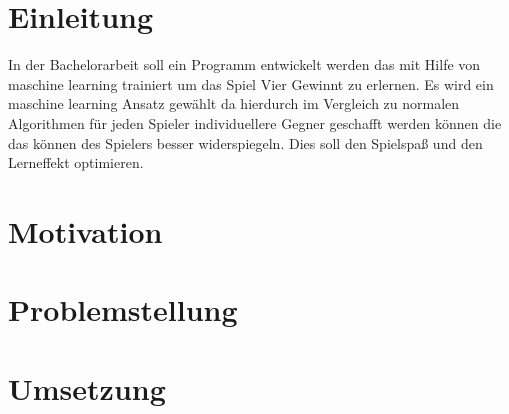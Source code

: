 \documentclass{article}
\begin{document}
 
\section{Einleitung}
In der Bachelorarbeit soll ein Programm entwickelt werden das mit Hilfe von maschine learning trainiert um das Spiel Vier Gewinnt zu erlernen. 
Es wird ein maschine learning Ansatz gewählt da hierdurch im Vergleich zu normalen Algorithmen für jeden Spieler individuellere Gegner geschafft werden können die das können des Spielers besser widerspiegeln.
Dies soll den Spielspaß und den Lerneffekt optimieren.%


\section{Motivation}



\section{Problemstellung}


\section{Umsetzung}




\end{document}
